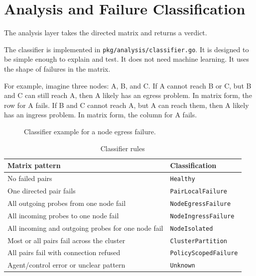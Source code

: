 \documentclass[11pt,a4paper]{article}
\newcommand{\code}[1]{\texttt{#1}}
\begin{document}
\section{Analysis and Failure Classification}

The analysis layer takes the directed matrix and returns a verdict.

The classifier is implemented in \code{pkg/analysis/classifier.go}. It is designed to be simple enough to explain and test. It does not need machine learning. It uses the shape of failures in the matrix.

For example, imagine three nodes: A, B, and C. If A cannot reach B or C, but B and C can still reach A, then A likely has an egress problem. In matrix form, the row for A fails. If B and C cannot reach A, but A can reach them, then A likely has an ingress problem. In matrix form, the column for A fails.

\begin{figure}[h]
\centering
{}
\caption{Classifier example for a node egress failure.}
\label{fig:classifier}
\end{figure}

\begin{table}[h]
\centering
\caption{Classifier rules}
\begin{tabularx}{\textwidth}{@{}YY@{}}
\toprule
\textbf{Matrix pattern} & \textbf{Classification} \\
\midrule
No failed pairs & \code{Healthy} \\
One directed pair fails & \code{PairLocalFailure} \\
All outgoing probes from one node fail & \code{NodeEgressFailure} \\
All incoming probes to one node fail & \code{NodeIngressFailure} \\
All incoming and outgoing probes for one node fail & \code{NodeIsolated} \\
Most or all pairs fail across the cluster & \code{ClusterPartition} \\
All pairs fail with connection refused & \code{PolicyScopedFailure} \\
Agent/control error or unclear pattern & \code{Unknown} \\
\bottomrule
\end{tabularx}
\end{table}
\end{document}
